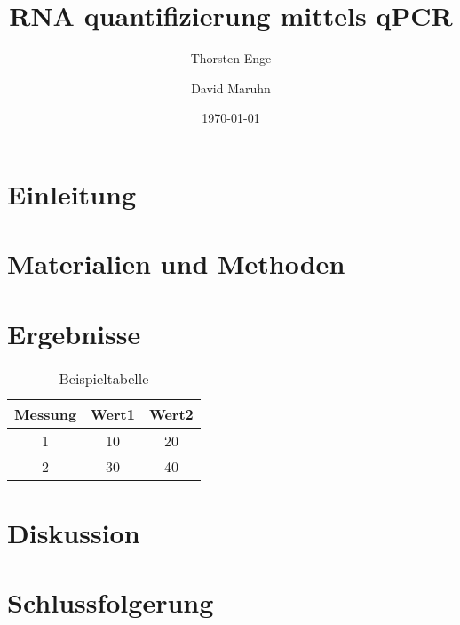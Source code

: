 \documentclass{article}
\title{RNA quantifizierung mittels qPCR}
\author{Thorsten Enge \and David Maruhn}
\date{\today}
\begin{document}
\maketitle

\tableofcontents
\newpage

\section{Einleitung}

\section{Materialien und Methoden}

\section{Ergebnisse}

\begin{table}[H]
    \centering
    \begin{tabular}{|c|c|c|}
    \hline
    Messung & Wert1 & Wert2 \\
    \hline
    1 & 10 & 20 \\
    2 & 30 & 40 \\
    \hline
    \end{tabular}
    \caption{Beispieltabelle}
    \label{tab:beispiel}
\end{table}


\section{Diskussion}

\section{Schlussfolgerung}



\end{document}
